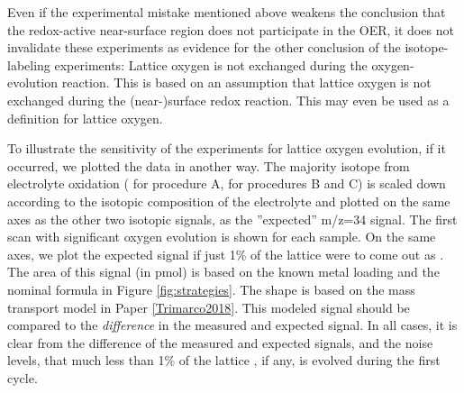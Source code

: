 Even if the experimental mistake mentioned above weakens the conclusion that the redox-active near-surface region does not participate in the OER, it does not invalidate these experiments as evidence for the other conclusion of the isotope-labeling experiments: Lattice oxygen is not exchanged during the oxygen-evolution reaction. This is based on an assumption that lattice oxygen is not exchanged during the (near-)surface redox reaction. This may even be used as a definition for lattice oxygen.

To illustrate the sensitivity of the experiments for lattice oxygen evolution, if it occurred, we plotted the data in another way. The majority isotope from electrolyte oxidation ( for procedure A,  for procedures B and C) is scaled down according to the isotopic composition of the electrolyte and plotted on the same axes as the other two  isotopic signals, as the ''expected'' m/z=34 signal. The first scan with significant oxygen evolution is shown for each sample.  On the same axes, we plot the expected signal if just 1\% of the lattice  were to come out as . The area of this signal (in pmol) is based on the known metal loading and the nominal formula in Figure \ref{fig:strategies}. The shape is based on the mass transport model in Paper \ref{Trimarco2018}. This modeled signal should be compared to the \textit{difference} in the measured and expected  signal. In all cases, it is clear from the difference of the measured and expected signals, and the noise levels, that much less than 1\% of the lattice , if any, is evolved during the first cycle.

